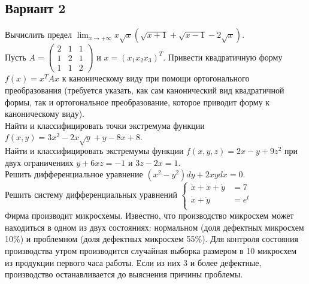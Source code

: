 \documentclass[addpoints, answers]{exam} %
\begin{document}
\subsection{Вариант 2}
\begin{questions}
\question Вычислить предел $\lim_{x\to +\infty} x \sqrt{x}(\sqrt{x+1}+\sqrt{x-1}-2\sqrt{x})$.\\
\question  Пусть $A=
\left(\begin{array}{ccc}
2 & 1 & 1\\
1 & 2 & 1\\
1 & 1 & 2
\end{array}\right)$ и $x=(x_1 x_2 x_3)^T$. Привести квадратичную форму $f(x)=x^T Ax$ к каноническому виду при помощи ортогонального преобразования (требуется указать, как сам канонический вид квадратичной формы, так и ортогональное преобразование, которое приводит форму к каноническому виду).\\
\question  Найти и классифицировать точки экстремума функции $f(x,y)=3x^2-2x\sqrt{y}+y-8x+8$.\\
\question  Найти и классифицировать экстремумы функции $f(x,y,z)=2x-y+9z^2$ при двух ограничениях $y+6xz=-1$ и $3z-2x=1$.\\
\question  Решить дифференциальное уравнение $(x^2-y^2)dy + 2xydx=0$.\\
\question  Решить систему дифференциальных уравнений 
$\left\{
\begin{aligned}
\ddot{x}+\dot{x}+\dot{y} & = 7\\
\dot{x}+\ddot{y}         & = e^t\\
\end{aligned}\right.$\\
\question  Фирма производит микросхемы. Известно, что производство микросхем может находиться в одном из двух состояниях: нормальном (доля дефектных микросхем 10\%) и проблемном (доля дефектных микросхем 55\%). Для контроля состояния производства утром производится случайная выборка размером в 10 микросхем из продукции первого часа работы. Если из них 3 и более дефектные, производство останавливается до выяснения причины проблемы.
\end{questions}
\end{document}
